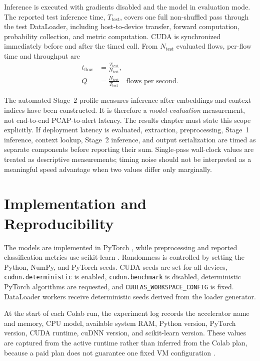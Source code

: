 Inference is executed with gradients disabled and the model in evaluation
mode. The reported test inference time, $T_{\mathrm{test}}$, covers one full
non-shuffled pass through the test DataLoader, including host-to-device
transfer, forward computation, probability collection, and metric computation.
CUDA is synchronized immediately before and after the timed call. From
$N_{\mathrm{test}}$ evaluated flows, per-flow time and throughput are
\begin{align}
    t_{\mathrm{flow}} &= \frac{T_{\mathrm{test}}}{N_{\mathrm{test}}}, \\
    Q &= \frac{N_{\mathrm{test}}}{T_{\mathrm{test}}}
    \quad \text{flows per second}.
    \label{eq:inference_efficiency}
\end{align}

The automated Stage~2 profile measures inference after embeddings and context
indices have been constructed. It is therefore a \emph{model-evaluation}
measurement, not end-to-end PCAP-to-alert latency. The results chapter must
state this scope explicitly. If deployment latency is evaluated, extraction,
preprocessing, Stage~1 inference, context lookup, Stage~2 inference, and output
serialization are timed as separate components before reporting their sum.
Single-pass wall-clock values are treated as descriptive measurements; timing
noise should not be interpreted as a meaningful speed advantage when two
values differ only marginally.

\section{Implementation and Reproducibility}
\label{subsec:experimental_reproducibility}

The models are implemented in PyTorch \cite{Paszke2019PyTorch}, while
preprocessing and reported
classification metrics use scikit-learn
\cite{Pedregosa2011ScikitLearn}. Randomness is controlled by setting the Python,
NumPy, and PyTorch seeds. CUDA seeds are set for all devices,
\texttt{cudnn.deterministic} is enabled,
\texttt{cudnn.benchmark} is disabled, deterministic PyTorch algorithms are
requested, and \texttt{CUBLAS\_WORKSPACE\_CONFIG} is fixed. DataLoader workers
receive deterministic seeds derived from the loader generator.

At the start of each Colab run, the experiment log records the accelerator
name and memory, CPU model, available system RAM, Python version, PyTorch
version, CUDA runtime, cuDNN version, and scikit-learn version. These values are
captured from the active runtime rather than inferred from the Colab plan,
because a paid plan does not guarantee one fixed VM configuration
\cite{GoogleColabFAQ2026}.

